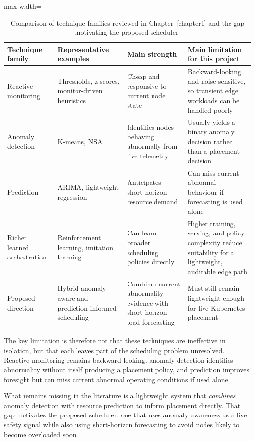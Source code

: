 \begin{table}[h]
\centering
\small
\renewcommand{\arraystretch}{1.2}
\begin{adjustbox}{max width=\textwidth}
\begin{tabular}{p{2.9cm}p{3.0cm}p{3.0cm}p{5.0cm}}
\hline
\textbf{Technique family} & \textbf{Representative examples} & \textbf{Main strength} & \textbf{Main limitation for this project} \\
\hline
Reactive monitoring & Thresholds, z-scores, monitor-driven heuristics & Cheap and responsive to current node state & Backward-looking and noise-sensitive, so transient edge workloads can be handled poorly \\
\hline
Anomaly detection & K-means, NSA & Identifies nodes behaving abnormally from live telemetry & Usually yields a binary anomaly decision rather than a placement decision \\
\hline
Prediction & ARIMA, lightweight regression & Anticipates short-horizon resource demand & Can miss current abnormal behaviour if forecasting is used alone \\
\hline
Richer learned orchestration & Reinforcement learning, imitation learning & Can learn broader scheduling policies directly & Higher training, serving, and policy complexity reduce suitability for a lightweight, auditable edge path \\
\hline
Proposed direction & Hybrid anomaly-aware and prediction-informed scheduling & Combines current abnormality evidence with short-horizon load forecasting & Must still remain lightweight enough for live Kubernetes placement \\
\hline
\end{tabular}
\end{adjustbox}
\renewcommand{\arraystretch}{1.0}
\caption{Comparison of technique families reviewed in Chapter~\ref{chapter1} and the gap motivating the proposed scheduler.}
\label{tab:ch1-technique-comparison}
\end{table}

The key limitation is therefore not that these techniques are ineffective in isolation, but that each leaves part of the scheduling problem unresolved. Reactive monitoring remains backward-looking, anomaly detection identifies abnormality without itself producing a placement policy, and prediction improves foresight but can miss current abnormal operating conditions if used alone \cite{pashaeehir2025kubedsm,fritzsche2024lightweight}.

What remains missing in the literature is a lightweight system that \textit{combines} anomaly detection with resource prediction to inform placement directly. That gap motivates the proposed scheduler: one that uses anomaly awareness as a live safety signal while also using short-horizon forecasting to avoid nodes likely to become overloaded soon.

